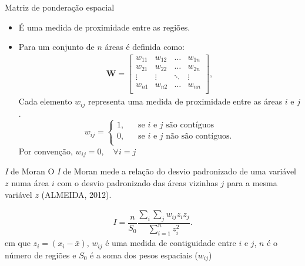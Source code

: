 \documentclass[aspectratio=169]{beamer}
\begin{document}
\begin{frame}{Matriz de ponderação espacial}
	\begin{itemize}
	    \item É uma medida de proximidade entre as regiões.
	    \item Para um conjunto de $n$ áreas é definida como: 
	    \begin{align*}
        	\boldsymbol{W} =
	        \left[
	        \begin{array}{cccc}
		        w_{11} & w_{12} & \dots & w_{1n} \\
		        w_{21} & w_{22} & \dots &w_{2n} \\
		        \vdots & \vdots & \ddots & \vdots \\
		        w_{n1} & w_{n2} & \dots & w_{nn}\\
	        \end{array}
	        \right],
        \end{align*}
        \noindent Cada elemento $w_{ij}$ representa uma medida de proximidade entre as áreas $i$ e $j$. 
        \[
            w_{ij} = 
            \begin{cases}
                \text{1,} & \quad\text{se $i$ e $j$ são contíguos} \\
                \text{0,} & \quad\text{se $i$ e $j$ não são contíguos.}\\
            \end{cases}
        \]
        \noindent Por convenção, $w_{ij}=0,\quad \forall i=j$
	\end{itemize}
\end{frame}

\begin{frame}{\textit{I} de Moran}
	O \textit{I} de Moran mede a relação do desvio padronizado de uma variável $z$ numa área $i$ com o desvio padronizado das 	áreas vizinhas $j$ para a mesma variável $z$ (ALMEIDA, 2012).
	
	\begin{block}{}
		\small
		\begin{align}
		\label{IMoran}
		I = \dfrac{n}{S_0} \dfrac{\displaystyle\sum_{i} \sum_{j} w_{ij} z_i z_j}{\displaystyle\sum_{i=1}^{n} z_i^2}.
		\end{align}
		\noindent \small em que $z_i = (x_i - \bar{x})$, $w_{ij}$ é uma medida de contiguidade entre $i$ e $j$,  $n$ é o número de regiões e $S_0$ é a soma dos pesos espaciais ($w_{ij}$)
	\end{block}	
\end{frame}
\end{document}
